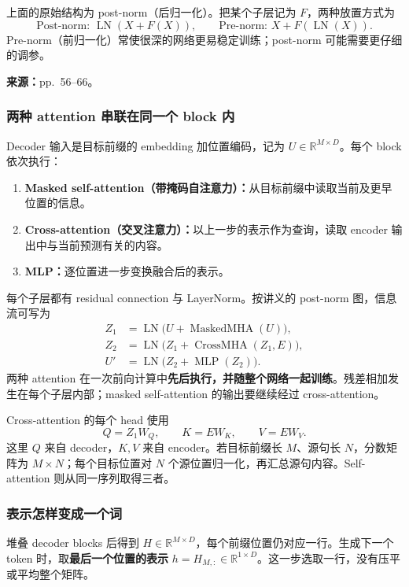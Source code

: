 上面的原始结构为 post-norm（后归一化）。把某个子层记为 $F$，两种放置方式为
\[
 \text{Post-norm: }\operatorname{LN}(X+F(X)),\qquad
 \text{Pre-norm: }X+F(\operatorname{LN}(X)).
\]
Pre-norm（前归一化）常使很深的网络更易稳定训练；post-norm 可能需要更仔细的调参。


\textbf{来源：}pp.~56--66。

\subsubsection{两种 attention 串联在同一个 block 内}

Decoder 输入是目标前缀的 embedding 加位置编码，记为 $U\in\mathbb R^{M\times D}$。每个 block 依次执行：
\begin{enumerate}
 \item \textbf{Masked self-attention（带掩码自注意力）：}从目标前缀中读取当前及更早位置的信息。
 \item \textbf{Cross-attention（交叉注意力）：}以上一步的表示作为查询，读取 encoder 输出中与当前预测有关的内容。
 \item \textbf{MLP：}逐位置进一步变换融合后的表示。
\end{enumerate}
每个子层都有 residual connection 与 LayerNorm。按讲义的 post-norm 图，信息流可写为
\[
 \begin{aligned}
 Z_1&=\operatorname{LN}\bigl(U+\operatorname{MaskedMHA}(U)\bigr),\\
 Z_2&=\operatorname{LN}\bigl(Z_1+\operatorname{CrossMHA}(Z_1,E)\bigr),\\
 U'&=\operatorname{LN}\bigl(Z_2+\operatorname{MLP}(Z_2)\bigr).
 \end{aligned}
\]
两种 attention 在一次前向计算中\textbf{先后执行，并随整个网络一起训练}。残差相加发生在每个子层内部；masked self-attention 的输出要继续经过 cross-attention。

Cross-attention 的每个 head 使用
\[
 Q=Z_1W_Q,\qquad K=EW_K,\qquad V=EW_V.
\]
这里 $Q$ 来自 decoder，$K,V$ 来自 encoder。若目标前缀长 $M$、源句长 $N$，分数矩阵为 $M\times N$；每个目标位置对 $N$ 个源位置归一化，再汇总源句内容。Self-attention 则从同一序列取得三者。

\subsubsection{表示怎样变成一个词}

堆叠 decoder blocks 后得到 $H\in\mathbb R^{M\times D}$，每个前缀位置仍对应一行。生成下一个 token 时，取\textbf{最后一个位置的表示} $h=H_{M,:}\in\mathbb R^{1\times D}$。这一步选取一行，没有压平或平均整个矩阵。

